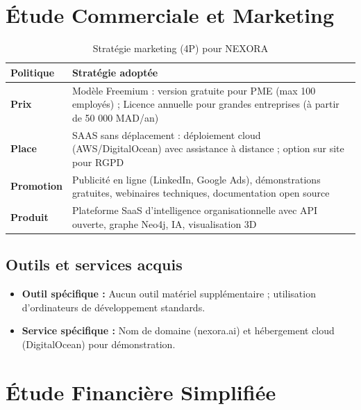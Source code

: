 \documentclass[12pt,a4paper]{report}
\begin{document}
\section{Étude Commerciale et Marketing}

\begin{table}[H]
\centering
\caption{Stratégie marketing (4P) pour NEXORA}
\label{tab:marketing}
\begin{tabular}{p{3cm} p{11.5cm}}
\toprule
\textbf{Politique} & \textbf{Stratégie adoptée} \\
\midrule
\textbf{Prix} & Modèle Freemium : version gratuite pour PME (max 100 employés) ; Licence annuelle pour grandes entreprises (à partir de 50 000 MAD/an) \\
\textbf{Place} & SAAS sans déplacement : déploiement cloud (AWS/DigitalOcean) avec assistance à distance ; option sur site pour RGPD \\
\textbf{Promotion} & Publicité en ligne (LinkedIn, Google Ads), démonstrations gratuites, webinaires techniques, documentation open source \\
\textbf{Produit} & Plateforme SaaS d'intelligence organisationnelle avec API ouverte, graphe Neo4j, IA, visualisation 3D \\
\bottomrule
\end{tabular}
\end{table}

\subsection{Outils et services acquis}
\begin{itemize}
  \item \textbf{Outil spécifique :} Aucun outil matériel supplémentaire ; utilisation d'ordinateurs de développement standards.
  \item \textbf{Service spécifique :} Nom de domaine (nexora.ai) et hébergement cloud (DigitalOcean) pour démonstration.
\end{itemize}

\section{Étude Financière Simplifiée}
\end{document}
